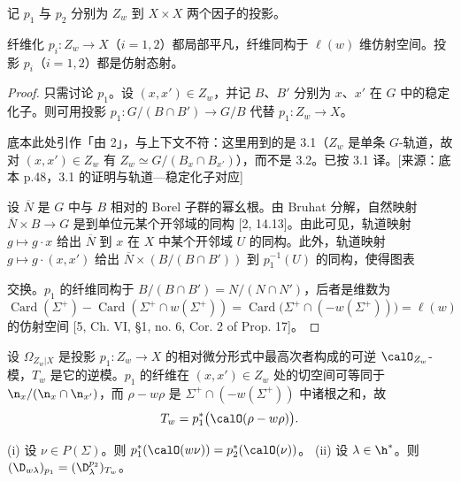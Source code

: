 记 $p_1$ 与 $p_2$ 分别为 $Z_w$ 到 $X\times X$ 两个因子的投影。

\begin{lemma}\label{lem:03.3.2}
纤维化 $p_i:Z_w\to X$（$i=1,2$）都局部平凡，纤维同构于 $\ell(w)$ 维仿射空间。投影 $p_i$（$i=1,2$）都是仿射态射。
\end{lemma}

\begin{proof}
只需讨论 $p_1$。设 $(x,x')\in Z_w$，并记 $B$、$B'$ 分别为 $x$、$x'$ 在 $G$ 中的稳定化子。则可用投影 $p_1:G/(B\cap B')\to G/B$ 代替 $p_1:Z_w\to X$。
\begin{annote}
底本此处引作「由 2」，与上下文不符：这里用到的是 3.1（$Z_w$ 是单条 $G$-轨道，故对 $(x,x')\in Z_w$ 有 $Z_w\simeq G/(B_x\cap B_{x'})$），而不是 3.2。已按 3.1 译。[来源：底本 p.48，3.1 的证明与轨道—稳定化子对应]
\end{annote}
设 $\overline{N}$ 是 $G$ 中与 $B$ 相对的 Borel 子群的幂幺根。由 Bruhat 分解，自然映射 $\overline{N}\times B\to G$ 是到单位元某个开邻域的同构 [2, 14.13]。由此可见，轨道映射 $g\mapsto g\cdot x$ 给出 $\overline{N}$ 到 $x$ 在 $X$ 中某个开邻域 $U$ 的同构。此外，轨道映射 $g\mapsto g\cdot(x,x')$ 给出 $\overline{N}\times(B/(B\cap B'))$ 到 $p_1^{-1}(U)$ 的同构，使得图表
\begin{center}
\end{center}
交换。$p_1$ 的纤维同构于 $B/(B\cap B')=N/(N\cap N')$，后者是维数为
$$\operatorname{Card}(\Sigma^+)-\operatorname{Card}(\Sigma^+\cap w(\Sigma^+))=\operatorname{Card}\bigl(\Sigma^+\cap(-w(\Sigma^+))\bigr)=\ell(w)$$
的仿射空间 [5, Ch. VI, §1, no. 6, Cor. 2 of Prop. 17]。
\end{proof}

设 $\Omega_{Z_w|X}$ 是投影 $p_1:Z_w\to X$ 的相对微分形式中最高次者构成的可逆 $\calO_{Z_w}$-模，$T_w$ 是它的逆模。$p_1$ 的纤维在 $(x,x')\in Z_w$ 处的切空间可等同于 $\n_x/(\n_x\cap\n_{x'})$，而 $\rho-w\rho$ 是 $\Sigma^+\cap(-w(\Sigma^+))$ 中诸根之和，故
$$T_w=p_1^*\bigl(\calO(\rho-w\rho)\bigr).$$

\begin{lemma}\label{lem:03.3.3}
(i) 设 $\nu\in P(\Sigma)$。则 $p_1^*(\calO(w\nu))=p_2^*(\calO(\nu))$。
(ii) 设 $\lambda\in\h^*$。则 $(\D_{w\lambda})_{p_1}=(\D^{p_2}_\lambda)_{T_w}$。
\end{lemma}

